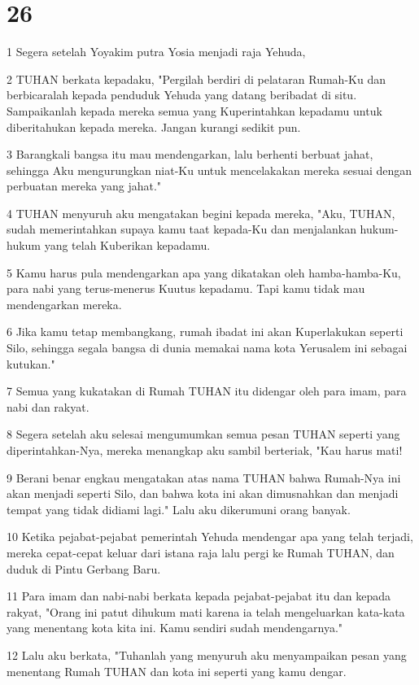 \chapter{26}

\par 1 Segera setelah Yoyakim putra Yosia menjadi raja Yehuda,
\par 2 TUHAN berkata kepadaku, "Pergilah berdiri di pelataran Rumah-Ku dan berbicaralah kepada penduduk Yehuda yang datang beribadat di situ. Sampaikanlah kepada mereka semua yang Kuperintahkan kepadamu untuk diberitahukan kepada mereka. Jangan kurangi sedikit pun.
\par 3 Barangkali bangsa itu mau mendengarkan, lalu berhenti berbuat jahat, sehingga Aku mengurungkan niat-Ku untuk mencelakakan mereka sesuai dengan perbuatan mereka yang jahat."
\par 4 TUHAN menyuruh aku mengatakan begini kepada mereka, "Aku, TUHAN, sudah memerintahkan supaya kamu taat kepada-Ku dan menjalankan hukum-hukum yang telah Kuberikan kepadamu.
\par 5 Kamu harus pula mendengarkan apa yang dikatakan oleh hamba-hamba-Ku, para nabi yang terus-menerus Kuutus kepadamu. Tapi kamu tidak mau mendengarkan mereka.
\par 6 Jika kamu tetap membangkang, rumah ibadat ini akan Kuperlakukan seperti Silo, sehingga segala bangsa di dunia memakai nama kota Yerusalem ini sebagai kutukan."
\par 7 Semua yang kukatakan di Rumah TUHAN itu didengar oleh para imam, para nabi dan rakyat.
\par 8 Segera setelah aku selesai mengumumkan semua pesan TUHAN seperti yang diperintahkan-Nya, mereka menangkap aku sambil berteriak, "Kau harus mati!
\par 9 Berani benar engkau mengatakan atas nama TUHAN bahwa Rumah-Nya ini akan menjadi seperti Silo, dan bahwa kota ini akan dimusnahkan dan menjadi tempat yang tidak didiami lagi." Lalu aku dikerumuni orang banyak.
\par 10 Ketika pejabat-pejabat pemerintah Yehuda mendengar apa yang telah terjadi, mereka cepat-cepat keluar dari istana raja lalu pergi ke Rumah TUHAN, dan duduk di Pintu Gerbang Baru.
\par 11 Para imam dan nabi-nabi berkata kepada pejabat-pejabat itu dan kepada rakyat, "Orang ini patut dihukum mati karena ia telah mengeluarkan kata-kata yang menentang kota kita ini. Kamu sendiri sudah mendengarnya."
\par 12 Lalu aku berkata, "Tuhanlah yang menyuruh aku menyampaikan pesan yang menentang Rumah TUHAN dan kota ini seperti yang kamu dengar.
